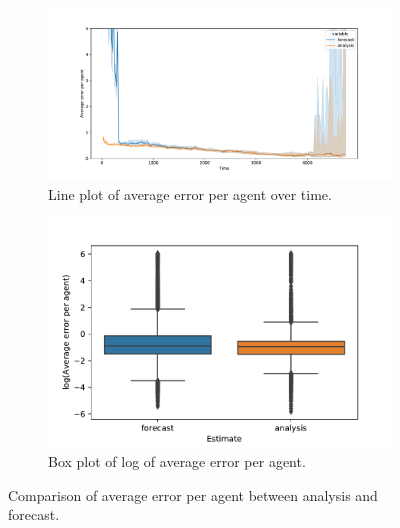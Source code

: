 \documentclass{article}
\begin{document}
\begin{figure}[htbp]
	\centering
	\begin{subfigure}[htb]{0.54\textwidth}
		\centering
		\includegraphics[width=\textwidth]{figures/exp2/truncated_median_analysis_forecast_line.pdf}
		\caption{Line plot of average error per agent over
			time.}\label{fig:analysis_forecast_line}
	\end{subfigure}
	\hfill
	\begin{subfigure}[htb]{0.45\textwidth}
		\centering
		\includegraphics[width=\textwidth]{figures/exp2/truncated_median_analysis_forecast_log_box.pdf}
		\caption{Box plot of log of average error per
			agent.}\label{fig:analysis_forecast_log_box}
	\end{subfigure}
	\caption{Comparison of average error per agent between analysis and
		forecast.}\label{fig:median_analysis_forecast}
\end{figure}
\end{document}
